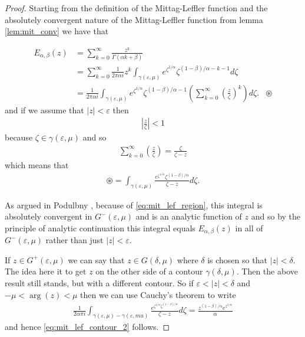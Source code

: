 \begin{proof}
    Starting from the definition of the Mittag-Leffler function and the absolutely convergent nature of the Mittag-Leffler function from lemma \ref{lem:mit_conv} we have that
    
    \begin{align}
	E_{\alpha, \beta}(z) &= \sum_{k=0}^\infty \frac{z^k}{\Gamma(\alpha k + \beta)} \\
	    &= \sum_{k=0}^\infty \frac{1}{2\pi\alpha i} z^k \int_{\gamma(\varepsilon, \mu)} e^{\zeta^{1 / \alpha}} \zeta^{(1-\beta)/\alpha - k - 1} d\zeta \\
	&= \frac{1}{2 \pi \alpha i}  \int_{\gamma(\varepsilon, \mu)} e^{\zeta^{1 / \alpha}} \zeta^{(1-\beta)/\alpha - 1} \left(\sum_{k=0}^\infty \left( \frac{z}{\zeta}\right)^k \right) d\zeta. & \circledast
   \end{align}
and if we assume that $ |z| < \varepsilon $ then
\begin{align}
    \left| \frac{z}{\zeta}\right| < 1
\end{align}
because $ \zeta \in \gamma(\varepsilon, \mu) $ and so
\begin{align}
   \sum_{k=0}^\infty \left( \frac{z}{\zeta} \right) = \frac{\zeta}{\zeta - z}
\end{align}
which means that
\begin{align}
    \circledast = \int_{\gamma(\varepsilon, \mu)} \frac{e^{\zeta^{1 / \alpha}}\zeta^{(1-\beta)/\alpha}}{\zeta - z} d\zeta.
\end{align}

As argued in Podulbny \cite{Podlubny1999}, because of \ref{eq:mit_lef_region}, this integral is absolutely convergent in $G^-(\varepsilon, \mu) $ and is an analytic function of $ z $ and so by the principle of analytic continuation this integral equals $ E_{\alpha, \beta}(z) $ in all of $ G^-(\varepsilon, \mu) $ rather than just $ |z| < \varepsilon $.

If $ z \in G^+(\varepsilon, \mu) $ we can say that $ z \in G(\delta, \mu) $ where $ \delta $ is chosen so that $ |z| < \delta $. The idea here it to get $ z $ on the other side of a contour $ \gamma(\delta, \mu) $.
Then the above result still stands, but with a different contour. So if $ \varepsilon < |z| <\delta $ and $ -\mu < \arg(z) < \mu $ then we can use Cauchy's theorem to write
\begin{align}
    \frac{1}{2\alpha \pi i} \int_{\gamma(\varepsilon, \mu) - \gamma(\varepsilon, mu)} \frac{e^{\zeta^{1 / \alpha} \zeta^{(1-\beta)/\alpha}}}{\zeta - z} d \zeta = \frac{z^{(1-\beta)/\alpha} e^{z^{1/\alpha}}}{\alpha}
\end{align}
and hence \ref{eq:mit_lef_contour_2} follows.
\end{proof}

